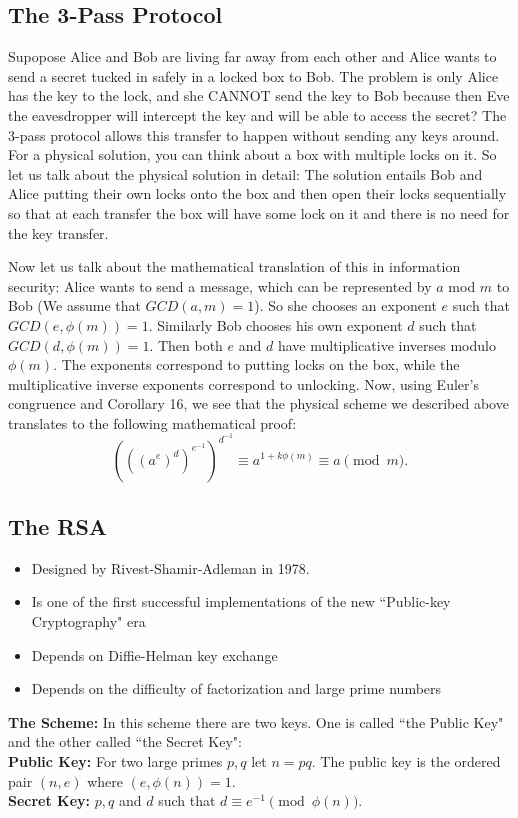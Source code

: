 \documentclass[12pt]{article}
\theoremstyle{plain}
\theoremstyle{definition}
\theoremstyle{remark}
\begin{document}
\subsection{The 3-Pass Protocol}
Supopose Alice and Bob are living far away from each other and Alice wants to send a secret tucked in safely in a locked box to Bob. The problem is only Alice has the key to the lock, and she CANNOT send the key to Bob because then Eve the eavesdropper will intercept the key and will be able to access the secret? The 3-pass protocol allows this transfer to happen without sending any keys around. For a physical solution, you can think about a box with multiple locks on it. 
\bigskip
\noindent
So let us talk about the physical solution in detail: The solution entails Bob and Alice putting their own locks onto the box and then open their locks sequentially so that at each transfer the box will have some lock on it and there is no need for the key transfer.

\bigskip
\noindent
Now let us talk about the mathematical translation of this in information security:
Alice wants to send a message, which can be represented by $a$ mod $m$ to Bob (We assume that $GCD(a,m)=1$). So she chooses an exponent $e$ such that $GCD(e, \phi(m))=1$. Similarly Bob chooses his own exponent $d$ such that $GCD(d, \phi(m))=1$. Then both $e$ and $d$ have multiplicative inverses modulo $\phi(m)$. The exponents correspond to putting locks on the box, while the multiplicative inverse exponents correspond to unlocking.  Now, using Euler's congruence and Corollary 16, we see that the physical scheme we described above translates to the following mathematical proof:
$$(((a^e)^d)^{e^{-1}})^{d^{-1}} \equiv a^{1+k\phi(m)}\equiv a \pmod{m}.$$

\subsection{The RSA}
\begin{itemize}
    \item Designed by Rivest-Shamir-Adleman in 1978.
    \item Is one of the first successful implementations of the new ``Public-key Cryptography" era
    \item Depends on Diffie-Helman key exchange
    \item Depends on the difficulty of factorization and large prime numbers
\end{itemize}

\bigskip
\noindent
{\bf The Scheme:} In this scheme there are two keys. One is called ``the Public Key" and the other called ``the Secret Key":
\\
{\bf Public Key:} For two large primes $p, q$ let $n=pq$. The public key is the ordered pair $(n,e)$ where $(e, \phi(n))=1$.
\\
{\bf Secret Key:} $p, q$ and $d$ such that $d\equiv e^{-1} \pmod{\phi(n)}$.
\end{document}
